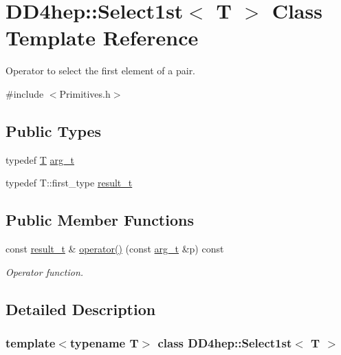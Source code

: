 \hypertarget{class_d_d4hep_1_1_select1st}{}\section{D\+D4hep\+:\+:Select1st$<$ T $>$ Class Template Reference}
\label{class_d_d4hep_1_1_select1st}


Operator to select the first element of a pair.  




{\ttfamily \#include $<$Primitives.\+h$>$}

\subsection*{Public Types}
\begin{DoxyCompactItemize}
\item 
typedef \hyperlink{class_t}{T} \hyperlink{class_d_d4hep_1_1_select1st_a271f38874bb7bcaf5867dc6d4ad356d1}{arg\+\_\+t}
\item 
typedef T\+::first\+\_\+type \hyperlink{class_d_d4hep_1_1_select1st_a39139f045fd65227afbed9a441a5eaea}{result\+\_\+t}
\end{DoxyCompactItemize}
\subsection*{Public Member Functions}
\begin{DoxyCompactItemize}
\item 
const \hyperlink{class_d_d4hep_1_1_select1st_a39139f045fd65227afbed9a441a5eaea}{result\+\_\+t} \& \hyperlink{class_d_d4hep_1_1_select1st_aa58aba96bc16bc52769db6b701e6998c}{operator()} (const \hyperlink{class_d_d4hep_1_1_select1st_a271f38874bb7bcaf5867dc6d4ad356d1}{arg\+\_\+t} \&p) const
\begin{DoxyCompactList}\small\item\em Operator function. \end{DoxyCompactList}\end{DoxyCompactItemize}


\subsection{Detailed Description}
\subsubsection*{template$<$typename T$>$\newline
class D\+D4hep\+::\+Select1st$<$ T $>$}

